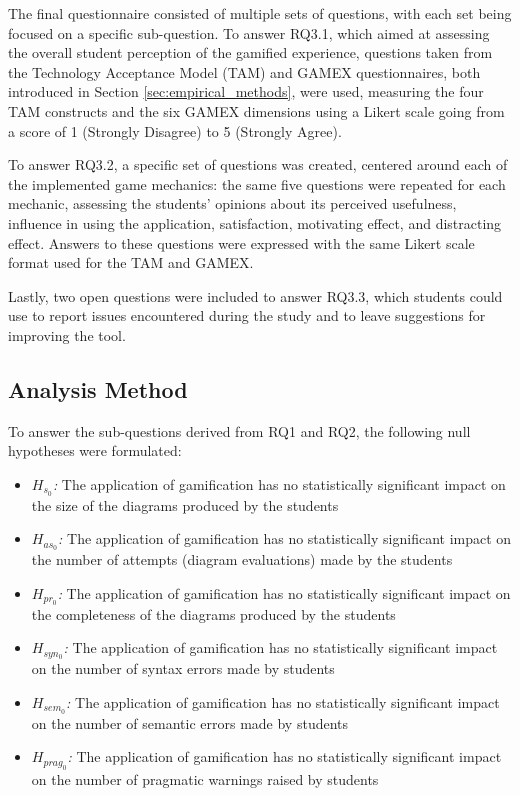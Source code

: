 The final questionnaire consisted of multiple sets of questions, with each set being focused on a specific sub-question. To answer RQ3.1, which aimed at assessing the overall student perception of the gamified experience, questions taken from the Technology Acceptance Model (TAM) \cite{davis1989perceived, lee2003technology} and GAMEX \cite{eppmann2018gameful} questionnaires, both introduced in Section \ref{sec:empirical_methods}, were used, measuring the four TAM constructs and the six GAMEX dimensions using a Likert scale going from a score of 1 (Strongly Disagree) to 5 (Strongly Agree).

To answer RQ3.2, a specific set of questions was created, centered around each of the implemented game mechanics: the same five questions were repeated for each mechanic, assessing the students' opinions about its perceived usefulness, influence in using the application, satisfaction, motivating effect, and distracting effect. Answers to these questions were expressed with the same Likert scale format used for the TAM and GAMEX.

Lastly, two open questions were included to answer RQ3.3, which students could use to report issues encountered during the study and to leave suggestions for improving the tool. 


\subsection{Analysis Method}
To answer the sub-questions derived from RQ1 and RQ2, the following null hypotheses were formulated:
\begin{itemize}
    \item \emph{${H_{s_{0}}}$:} The application of gamification has no statistically significant impact on the size of the diagrams produced by the students
    \item \emph{${H_{as_{0}}}$:} The application of gamification has no statistically significant impact on the number of attempts (diagram evaluations) made by the students
    \item \emph{${H_{pr_{0}}}$:} The application of gamification has no statistically significant impact on the completeness of the diagrams produced by the students
    \item \emph{${H_{syn_{0}}}$:} The application of gamification has no statistically significant impact on the number of syntax errors made by students
    \item \emph{${H_{sem_{0}}}$:} The application of gamification has no statistically significant impact on the number of semantic errors made by students
    \item \emph{${H_{prag_{0}}}$:} The application of gamification has no statistically significant impact on the number of pragmatic warnings raised by students
\end{itemize}


